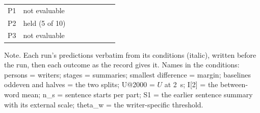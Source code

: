 {\begin{longtable}{@{}lp{0.86\linewidth}@{}}
P1 & not evaluable \\
P2 & held (5 of 10) \\
P3 & not evaluable \\
\bottomrule
\end{longtable}
\par\noindent Note. Each run's predictions verbatim from its conditions (italic), written before the run, then each outcome as the record gives it. Names in the conditions: persons = writers; stages = summaries; smallest difference = margin; baselines oddeven and halves = the two splits; U@2000 = $U$ at 2~s; I[2] = the between-word mean; n\_s = sentence starts per part; S1 = the earlier sentence summary with its external scale; theta\_w = the writer-specific threshold.\par
}
